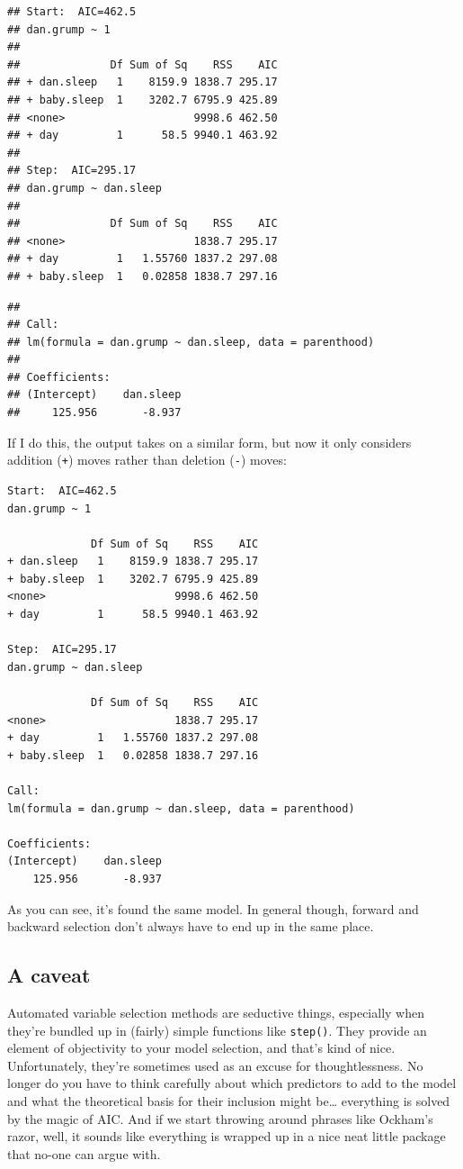 \documentclass[
]{book}
\begin{document}
\begin{verbatim}
## Start:  AIC=462.5
## dan.grump ~ 1
## 
##              Df Sum of Sq    RSS    AIC
## + dan.sleep   1    8159.9 1838.7 295.17
## + baby.sleep  1    3202.7 6795.9 425.89
## <none>                    9998.6 462.50
## + day         1      58.5 9940.1 463.92
## 
## Step:  AIC=295.17
## dan.grump ~ dan.sleep
## 
##              Df Sum of Sq    RSS    AIC
## <none>                    1838.7 295.17
## + day         1   1.55760 1837.2 297.08
## + baby.sleep  1   0.02858 1838.7 297.16
\end{verbatim}

\begin{verbatim}
## 
## Call:
## lm(formula = dan.grump ~ dan.sleep, data = parenthood)
## 
## Coefficients:
## (Intercept)    dan.sleep  
##     125.956       -8.937
\end{verbatim}

If I do this, the output takes on a similar form, but now it only considers addition (\texttt{+}) moves rather than deletion (\texttt{-}) moves:

\begin{verbatim}
Start:  AIC=462.5
dan.grump ~ 1

             Df Sum of Sq    RSS    AIC
+ dan.sleep   1    8159.9 1838.7 295.17
+ baby.sleep  1    3202.7 6795.9 425.89
<none>                    9998.6 462.50
+ day         1      58.5 9940.1 463.92

Step:  AIC=295.17
dan.grump ~ dan.sleep

             Df Sum of Sq    RSS    AIC
<none>                    1838.7 295.17
+ day         1   1.55760 1837.2 297.08
+ baby.sleep  1   0.02858 1838.7 297.16

Call:
lm(formula = dan.grump ~ dan.sleep, data = parenthood)

Coefficients:
(Intercept)    dan.sleep  
    125.956       -8.937  
\end{verbatim}

As you can see, it's found the same model. In general though, forward and backward selection don't always have to end up in the same place.

\hypertarget{a-caveat}{%
\subsection{A caveat}\label{a-caveat}}

Automated variable selection methods are seductive things, especially when they're bundled up in (fairly) simple functions like \texttt{step()}. They provide an element of objectivity to your model selection, and that's kind of nice. Unfortunately, they're sometimes used as an excuse for thoughtlessness. No longer do you have to think carefully about which predictors to add to the model and what the theoretical basis for their inclusion might be\ldots{} everything is solved by the magic of AIC. And if we start throwing around phrases like Ockham's razor, well, it sounds like everything is wrapped up in a nice neat little package that no-one can argue with.
\end{document}
